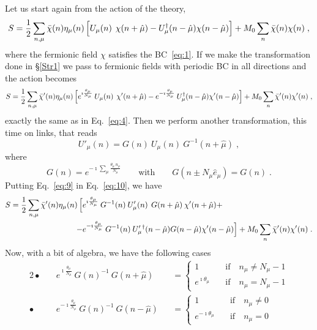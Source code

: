 \documentclass[a4paper,10pt]{article}
\newcommand{\Eq}[1]{Eq.~\eqref{eq:#1}}
\begin{document}
Let us start again from the action of the theory,
\begin{equation*}
  S=\frac{1}{2}\sum_{n,\mu}\bar\chi(n)\eta_\mu(n)\,\Bigl[U_\mu(n)^{\phantom{\dag}}\chi(n+\hat\mu)
					  -U^\dag_\mu(n-\hat\mu)\chi(n-\hat\mu)\Bigr]+M_0\sum_n \bar\chi(n)\chi(n)\;,
\end{equation*}
where the fermionic field $\chi$ satisfies the BC~\eqref{eq:1}. If we make the transformation done
in §\ref{Str1} we pass to fermionic fields with periodic BC in all directions and the action becomes
\begin{equation*}
  S=\frac{1}{2}\sum_{n,\mu}\bar\chi'(n)\eta_\mu(n)\,\Bigl[e^{\imath\frac{\theta_\mu}{N_\mu}}\:
	U_\mu(n)^{\phantom{\dag}}\chi'(n+\hat\mu)-e^{-\imath\frac{\theta_\mu}{N_\mu}}\:
	U^\dag_\mu(n-\hat\mu)\chi'(n-\hat\mu)\Bigr]+M_0\sum_n \bar\chi'(n)\chi'(n)\;,
\end{equation*}
exactly the same as in \Eq{4}. Then we perform another transformation, this time on links, that reads
\begin{equation}\label{eq:9}
 U'_\mu(n)=G(n)\:U_\mu(n)\:G^{-1}(n+\hat\mu) \;,
\end{equation}
where
\begin{equation*}
 G(n)=e^{-\imath\sum_\mu\frac{\theta_\mu\:n_\mu}{N_\mu}}\qquad \mbox{with}\qquad  G(n\pm N_\mu\hat{e}_\mu)=G(n)\;.
\end{equation*}
Putting \Eq{9} in \Eq{10}, we have
\begin{align*}
 S=\frac{1}{2}\sum_{n,\mu}\bar\chi'(n)\eta_\mu(n)\,\Bigl[&e^{\imath\frac{\theta_\mu}{N_\mu}}\:
	G^{-1}(n)\:U'_\mu(n)^{\phantom{\dag}}G(n+\hat\mu)\:\chi'(n+\hat\mu)+\notag\\
	-&e^{-\imath\frac{\theta_\mu}{N_\mu}}\:
	G^{-1}(n)\:U'^{\:\dag}_\mu(n-\hat\mu)G(n-\hat\mu)\chi'(n-\hat\mu)\Bigr]+M_0\sum_n \bar\chi'(n)\chi'(n)\;.
\end{align*}
Now, with a bit of algebra, we have the following cases
\begin{alignat*}{2}
  \bullet& \quad e^{\imath\frac{\theta_\mu}{N_\mu}}\:G(n)^{-1}\:G(n+\hat\mu)&&=\left\{
        \begin{aligned}
         1 &\quad\mbox{if}\quad n_\mu \neq N_\mu-1 \\
         e^{\imath\theta_\mu} &\quad\mbox{if}\quad n_\mu = N_\mu-1
        \end{aligned}
        \right.\\[1ex]
  \bullet& \quad e^{-\imath\frac{\theta_\mu}{N_\mu}}\:G(n)^{-1}\:G(n-\hat\mu)&&=\left\{
        \begin{aligned}
         1 &\quad\mbox{if}\quad n_\mu \neq 0 \\
         e^{-\imath\theta_\mu} &\quad\mbox{if}\quad n_\mu = 0
        \end{aligned}
        \right.
\end{alignat*}
\end{document}

